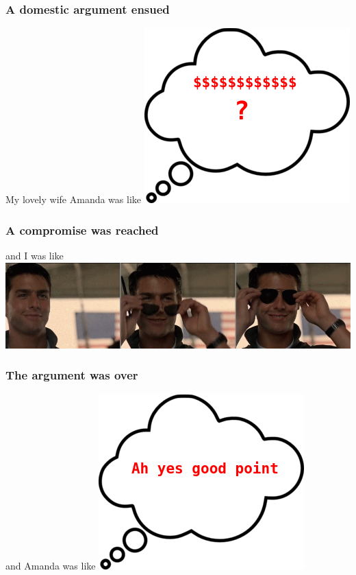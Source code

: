 \begin{frame}
\frametitle{A domestic argument ensued}
\begin{block}{My lovely wife Amanda was like}
\includegraphics[height=0.5\textheight]{image/thought-bubble-dollars.png}
\end{block}
\end{frame}

\begin{frame}
\frametitle{A compromise was reached}
\begin{block}{and I was like}
\includegraphics[height=0.3\textheight]{image/tom-cruise.png}
\end{block}
\end{frame}

\begin{frame}
\frametitle{The argument was over}
\begin{block}{and Amanda was like}
\includegraphics[height=0.5\textheight]{image/thought-bubble-good-point.png}
\end{block}
\end{frame}

